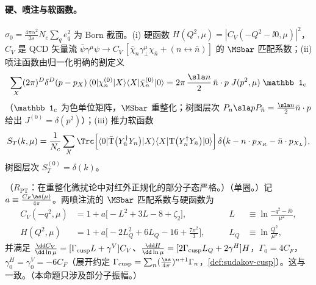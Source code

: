 \paragraph{硬、喷注与软函数。}
$\sigma_0=\frac{4\pi\alpha^2}{3s}N_c\sum_qe_q^2$ 为 Born 截面。(i) 硬函数 $H(Q^2,\mu)=|C_V(-Q^2-\ii0,\mu)|^2$，$C_V$ 是 QCD 矢量流 $\bar\psi\gamma^\mu\psi\to C_V\,[\bar\chi_n\gamma_\perp^\mu\chi_{\bar n}+(n\leftrightarrow\bar n)]$ 的 $\MSbar$ 匹配系数；(ii) 喷注函数由归一化明确的割定义
\begin{equation}\label{eq:scet-Jdef}
\sum_X(2\pi)^D\delta^D(p-p_X)\,\langle0|\chi^{(0)}_n|X\rangle\langle X|\bar\chi^{(0)}_n|0\rangle=2\pi\,\frac{\sla n}{2}\,\bar n\cdot p\;J(p^2,\mu)\;\mathbb 1_{\rm c}
\end{equation}
（$\mathbb 1_{\rm c}$ 为色单位矩阵，$\MSbar$ 重整化；树图层次 $P_n\sla pP_{\bar n}=\frac{\sla n}2\bar n\cdot p$ 给出 $J^{(0)}=\delta(p^2)$）；(iii) 推力软函数
\begin{equation}\label{eq:scet-Sdef}
S_T(k,\mu)=\frac{1}{N_c}\sum_{X}\Trc\Big[\langle0|\bar{\mathrm T}\big(Y_{\bar n}^\dagger Y_n\big)|X\rangle\langle X|\mathrm T\big(Y_n^\dagger Y_{\bar n}\big)|0\rangle\Big]\,
\delta\big(k-n\cdot p_{X_R}-\bar n\cdot p_{X_L}\big),
\end{equation}
树图层次 $S_T^{(0)}=\delta(k)$。

\begin{proposition}\label{prop:scet-hard-matching}
（$R_{\mathrm{PT}}$：在重整化微扰论中对红外正规化的部分子态严格。）（单圈。）记 $a\equiv\frac{C_F\as(\mu)}{4\pi}$。两喷注流的 $\MSbar$ 匹配系数与硬函数为
\begin{equation}\label{eq:scet-CV}
\begin{aligned}
C_V(-q^2,\mu)&=1+a\big[-L^2+3L-8+\zeta_2\big],&\qquad L&\equiv\ln\frac{-q^2-\ii0}{\mu^2},\\
H(Q^2,\mu)&=1+a\Big[-2L_Q^2+6L_Q-16+\frac{7\pi^2}{3}\Big],&\qquad L_Q&\equiv\ln\frac{Q^2}{\mu^2},
\end{aligned}
\end{equation}
并满足 $\frac{\dd C_V}{\dd\ln\mu}=[\Gamma_{\rm cusp}L+\gamma^V]C_V$、$\frac{\dd H}{\dd\ln\mu}=[2\Gamma_{\rm cusp}L_Q+2\gamma^H]H$，$\Gamma_0=4C_F$，$\gamma^H_0=\gamma^V_0=-6C_F$（展开约定 $\Gamma_{\rm cusp}=\sum_n(\frac{\as}{4\pi})^{n+1}\Gamma_n$，\cref{def:sudakov-cusp}）。这与\cite[附录~B]{BecherSchwartz2008}一致。（本命题只涉及部分子振幅。）
\end{proposition}

